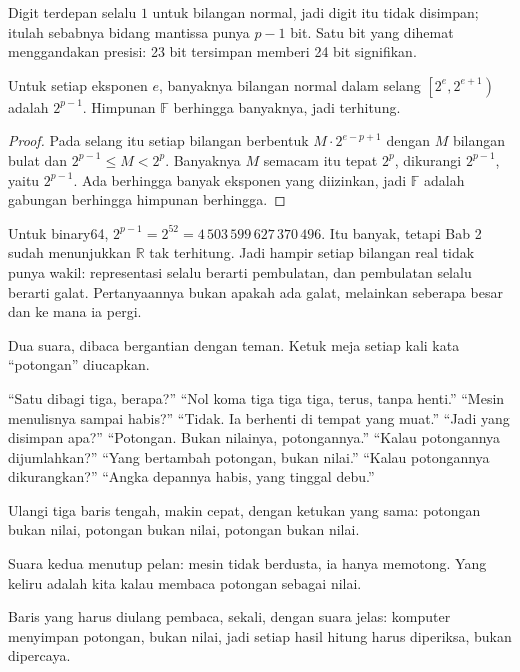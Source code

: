 Digit terdepan selalu $1$ untuk bilangan normal, jadi digit itu tidak disimpan;
itulah sebabnya bidang mantissa punya $p-1$ bit. Satu bit yang dihemat menggandakan
presisi: 23 bit tersimpan memberi 24 bit
signifikan.



\begin{teorema}
Untuk setiap eksponen $e$, banyaknya bilangan normal dalam selang
$\left[2^{e},2^{e+1}\right)$ adalah $2^{p-1}$. Himpunan $\mathbb{F}$ berhingga
banyaknya, jadi terhitung.
\end{teorema}

\begin{proof}
Pada selang itu setiap bilangan berbentuk $M\cdot2^{e-p+1}$ dengan $M$ bilangan bulat
dan $2^{p-1}\le M<2^{p}$. Banyaknya $M$ semacam itu tepat $2^{p}$, dikurangi
$2^{p-1}$, yaitu $2^{p-1}$. Ada berhingga banyak eksponen yang diizinkan, jadi
$\mathbb{F}$ adalah gabungan berhingga himpunan berhingga.
\end{proof}

Untuk binary64, $2^{p-1}=2^{52}=4\,503\,599\,627\,370\,496$. Itu banyak, tetapi Bab 2
sudah menunjukkan $\mathbb{R}$ tak terhitung. Jadi hampir setiap bilangan real tidak
punya wakil: representasi selalu berarti pembulatan, dan pembulatan selalu berarti
galat. Pertanyaannya bukan apakah ada galat, melainkan seberapa besar dan ke mana ia
pergi.

\begin{bacakeras}
Dua suara, dibaca bergantian dengan teman. Ketuk meja setiap kali kata ``potongan''
diucapkan.

``Satu dibagi tiga, berapa?'' ``Nol koma tiga tiga tiga, terus, tanpa henti.''
``Mesin menulisnya sampai habis?'' ``Tidak. Ia berhenti di tempat yang muat.''
``Jadi yang disimpan apa?'' ``Potongan. Bukan nilainya, potongannya.''
``Kalau potongannya dijumlahkan?'' ``Yang bertambah potongan, bukan nilai.''
``Kalau potongannya dikurangkan?'' ``Angka depannya habis, yang tinggal debu.''

Ulangi tiga baris tengah, makin cepat, dengan ketukan yang sama: potongan bukan nilai,
potongan bukan nilai, potongan bukan nilai.

Suara kedua menutup pelan: mesin tidak berdusta, ia hanya memotong. Yang keliru adalah
kita kalau membaca potongan sebagai nilai.

Baris yang harus diulang pembaca, sekali, dengan suara jelas: komputer menyimpan
potongan, bukan nilai, jadi setiap hasil hitung harus diperiksa, bukan dipercaya.
\end{bacakeras}

